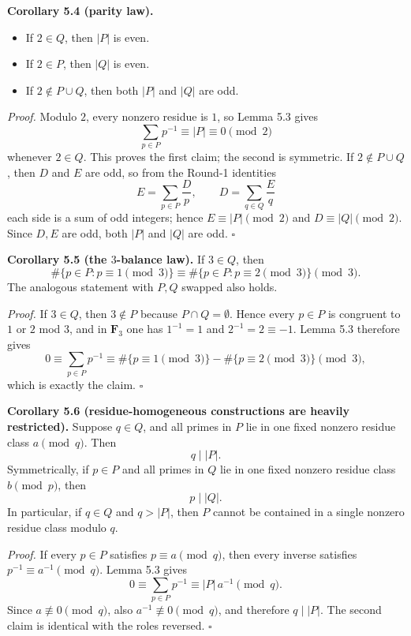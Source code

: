 \medskip
\textbf{Corollary 5.4 (parity law).}

\begin{itemize}
\item If $2\in Q$, then $|P|$ is even.
\item If $2\in P$, then $|Q|$ is even.
\item If $2\notin P\cup Q$, then both $|P|$ and $|Q|$ are odd.
\end{itemize}

\emph{Proof.}
Modulo $2$, every nonzero residue is $1$, so Lemma 5.3 gives
\[
\sum_{p\in P} p^{-1}\equiv |P|\equiv 0\pmod 2
\]
whenever $2\in Q$. This proves the first claim; the second is symmetric. If $2\notin P\cup Q$, then $D$ and $E$ are odd, so from the Round-1 identities
\[
E=\sum_{p\in P}\frac{D}{p},\qquad D=\sum_{q\in Q}\frac{E}{q}
\]
each side is a sum of odd integers; hence $E\equiv |P|\pmod 2$ and $D\equiv |Q|\pmod 2$. Since $D,E$ are odd, both $|P|$ and $|Q|$ are odd. \hfill $\square$

\medskip
\textbf{Corollary 5.5 (the $3$-balance law).}
If $3\in Q$, then
\[
\#\{p\in P: p\equiv 1\pmod 3\}
\equiv
\#\{p\in P: p\equiv 2\pmod 3\}
\pmod 3.
\]
The analogous statement with $P,Q$ swapped also holds.

\emph{Proof.}
If $3\in Q$, then $3\notin P$ because $P\cap Q=\emptyset$. Hence every $p\in P$ is congruent to $1$ or $2$ mod $3$, and in $\mathbf F_3$ one has $1^{-1}=1$ and $2^{-1}=2\equiv -1$. Lemma 5.3 therefore gives
\[
0\equiv \sum_{p\in P} p^{-1}
\equiv
\#\{p\equiv 1\pmod 3\}-\#\{p\equiv 2\pmod 3\}
\pmod 3,
\]
which is exactly the claim. \hfill $\square$

\medskip
\textbf{Corollary 5.6 (residue-homogeneous constructions are heavily restricted).}
Suppose $q\in Q$, and all primes in $P$ lie in one fixed nonzero residue class $a\pmod q$. Then
\[
q\mid |P|.
\]
Symmetrically, if $p\in P$ and all primes in $Q$ lie in one fixed nonzero residue class $b\pmod p$, then
\[
p\mid |Q|.
\]
In particular, if $q\in Q$ and $q>|P|$, then $P$ cannot be contained in a single nonzero residue class modulo $q$.

\emph{Proof.}
If every $p\in P$ satisfies $p\equiv a\pmod q$, then every inverse satisfies $p^{-1}\equiv a^{-1}\pmod q$. Lemma 5.3 gives
\[
0\equiv \sum_{p\in P} p^{-1}\equiv |P|\,a^{-1}\pmod q.
\]
Since $a\not\equiv 0\pmod q$, also $a^{-1}\not\equiv 0\pmod q$, and therefore $q\mid |P|$. The second claim is identical with the roles reversed. \hfill $\square$

